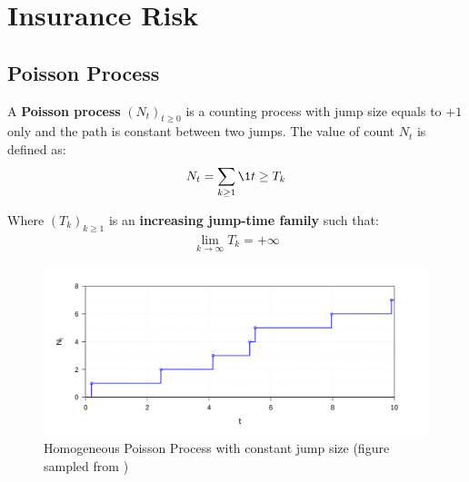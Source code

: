 \newpage
\section{Insurance Risk}

\subsection{Poisson Process}
\begin{definition}
    A \textbf{Poisson process} $(N_t)_{t\ge0}$ is a counting process with jump size equals to $+1$ only and the path is constant between two jumps. The value of count $N_t$ is defined as:
    \begin{align*}
        N_t = \sum_{k\ge 1}\1{t \ge T_k}
    \end{align*}

    \noindent Where $(T_k)_{k\ge1}$ is an \textbf{increasing jump-time family} such that:
    \begin{align*}
        \lim_{k\to\infty}T_k = +\infty
    \end{align*}
\end{definition}

\begin{figure}[ht]
    \centering
    \includegraphics[width=\textwidth]{figures/sample_homogeneous_poisson_process.png}
    \caption{Homogeneous Poisson Process with constant jump size (figure sampled from \cite{book:privault})}
    \label{fig:sample-homogeneous-poisson-proc}
\end{figure}

